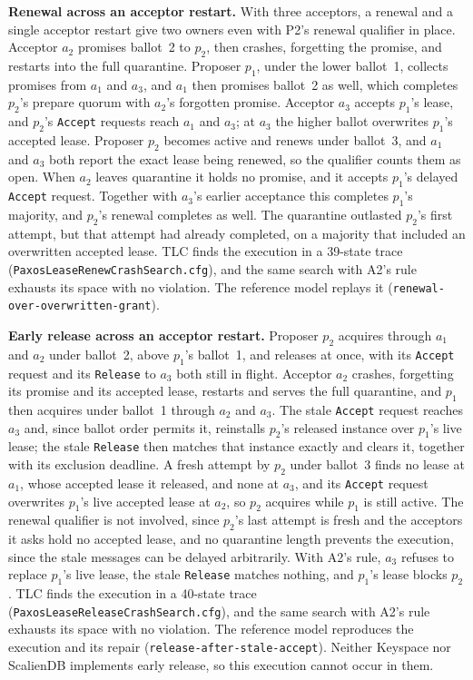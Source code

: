 \documentclass[final,5p,times,twocolumn,number]{elsarticle}
\newcommand{\code}[1]{\texttt{#1}}
\begin{document}
\noindent\textbf{Renewal across an acceptor restart.}  With three acceptors, a renewal and a single acceptor restart give two owners even with P2's renewal qualifier in place.  Acceptor $a_2$ promises ballot~2 to $p_2$, then crashes, forgetting the promise, and restarts into the full quarantine.  Proposer $p_1$, under the lower ballot~1, collects promises from $a_1$ and $a_3$, and $a_1$ then promises ballot~2 as well, which completes $p_2$'s prepare quorum with $a_2$'s forgotten promise.  Acceptor $a_3$ accepts $p_1$'s lease, and $p_2$'s \code{Accept} requests reach $a_1$ and $a_3$; at $a_3$ the higher ballot overwrites $p_1$'s accepted lease.  Proposer $p_2$ becomes active and renews under ballot~3, and $a_1$ and $a_3$ both report the exact lease being renewed, so the qualifier counts them as open.  When $a_2$ leaves quarantine it holds no promise, and it accepts $p_1$'s delayed \code{Accept} request.  Together with $a_3$'s earlier acceptance this completes $p_1$'s majority, and $p_2$'s renewal completes as well.  The quarantine outlasted $p_2$'s first attempt, but that attempt had already completed, on a majority that included an overwritten accepted lease.  TLC finds the execution in a 39-state trace (\code{PaxosLeaseRenewCrashSearch.cfg}), and the same search with A2's rule exhausts its space with no violation.  The reference model replays it (\code{renewal-over-overwritten-grant}).

\smallskip
\noindent\textbf{Early release across an acceptor restart.}  Proposer $p_2$ acquires through $a_1$ and $a_2$ under ballot~2, above $p_1$'s ballot~1, and releases at once, with its \code{Accept} request and its \code{Release} to $a_3$ both still in flight.  Acceptor $a_2$ crashes, forgetting its promise and its accepted lease, restarts and serves the full quarantine, and $p_1$ then acquires under ballot~1 through $a_2$ and $a_3$.  The stale \code{Accept} request reaches $a_3$ and, since ballot order permits it, reinstalls $p_2$'s released instance over $p_1$'s live lease; the stale \code{Release} then matches that instance exactly and clears it, together with its exclusion deadline.  A fresh attempt by $p_2$ under ballot~3 finds no lease at $a_1$, whose accepted lease it released, and none at $a_3$, and its \code{Accept} request overwrites $p_1$'s live accepted lease at $a_2$, so $p_2$ acquires while $p_1$ is still active.  The renewal qualifier is not involved, since $p_2$'s last attempt is fresh and the acceptors it asks hold no accepted lease, and no quarantine length prevents the execution, since the stale messages can be delayed arbitrarily.  With A2's rule, $a_3$ refuses to replace $p_1$'s live lease, the stale \code{Release} matches nothing, and $p_1$'s lease blocks $p_2$.  TLC finds the execution in a 40-state trace (\code{PaxosLeaseReleaseCrashSearch.cfg}), and the same search with A2's rule exhausts its space with no violation.  The reference model reproduces the execution and its repair (\code{release-after-stale-accept}).  Neither Keyspace nor ScalienDB implements early release, so this execution cannot occur in them.
\end{document}
